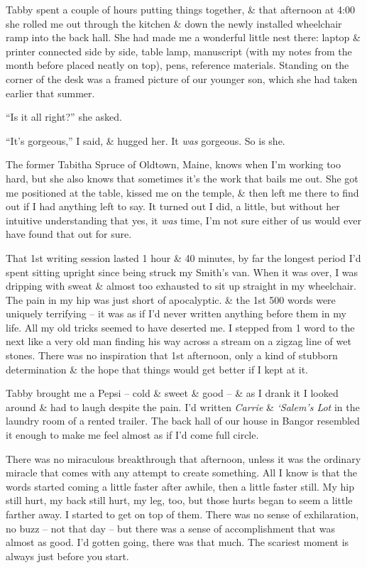\documentclass{article}
\numberwithin{equation}{section}
\begin{document}
Tabby spent a couple of hours putting things together, \& that afternoon at 4:00 she rolled me out through the kitchen \& down the newly installed wheelchair ramp into the back hall. She had made me a wonderful little nest there: laptop \& printer connected side by side, table lamp, manuscript (with my notes from the month before placed neatly on top), pens, reference materials. Standing on the corner of the desk was a framed picture of our younger son, which she had taken earlier that summer.

``Is it all right?'' she asked.

``It's gorgeous,'' I said, \& hugged her. It \textit{was} gorgeous. So is she.

The former Tabitha Spruce of Oldtown, Maine, knows when I'm working too hard, but she also knows that sometimes it's the work that bails me out. She got me positioned at the table, kissed me on the temple, \& then left me there to find out if I had anything left to say. It turned out I did, a little, but without her intuitive understanding that yes, it \textit{was} time, I'm not sure either of us would ever have found that out for sure.

That 1st writing session lasted 1 hour \& 40 minutes, by far the longest period I'd spent sitting upright since being struck my Smith's van. When it was over, I was dripping with sweat \& almost too exhausted to sit up straight in my wheelchair. The pain in my hip was just short of apocalyptic. \& the 1st 500 words were uniquely terrifying -- it was as if I'd never written anything before them in my life. All my old tricks seemed to have deserted me. I stepped from 1 word to the next like a very old man finding his way across a stream on a zigzag line of wet stones. There was no inspiration that 1st afternoon, only a kind of stubborn determination \& the hope that things would get better if I kept at it.

Tabby brought me a Pepsi -- cold \& sweet \& good -- \& as I drank it I looked around \& had to laugh despite the pain. I'd written \textit{Carrie} \& \textit{`Salem's Lot} in the laundry room of a rented trailer. The back hall of our house in Bangor resembled it enough to make me feel almost as if I'd come full circle.

There was no miraculous breakthrough that afternoon, unless it was the ordinary miracle that comes with any attempt to create something. All I know is that the words started coming a little faster after awhile, then a little faster still. My hip still hurt, my back still hurt, my leg, too, but those hurts began to seem a little farther away. I started to get on top of them. There was no sense of exhilaration, no buzz -- not that day -- but there was a sense of accomplishment that was almost as good. I'd gotten going, there was that much. The scariest moment is always just before you start.
\end{document}
